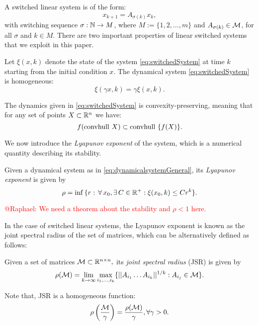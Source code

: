A switched linear system is of the form:
\begin{equation}\label{eq:switchedSystem}x_{k+1} = A_{\sigma(k)}x_k,\end{equation}
with switching sequence $\sigma: \mathbb{N} \to M$, where  $M := \{1,2, \dots,m\}$ and $A_{\sigma(k)} \in \mathcal{M}$, for all $\sigma$ and $k \in M$. There are two important properties of linear switched systems that we exploit in this paper.
\begin{property}\label{property:homogeneity}
Let $\xi(x, k)$ denote the state of the system \eqref{eq:switchedSystem} at time $k$ starting from the initial condition $x$. The dynamical system \eqref{eq:switchedSystem} is homogeneous:
$$\xi(\gamma x, k)= \gamma \xi(x, k). $$
\end{property}
\begin{property}\label{property:convpres}
The dynamics given in \eqref{eq:switchedSystem} is convexity-preserving, meaning that for any set of points $X \subset \mathbb{R}^n$ we have:
$$ f(\mbox{convhull }{X})\subset \mbox{convhull }\{f(X)\}. $$
\end{property}

We now introduce the \emph{Lyapunov exponent} of the system, which is a numerical quantity describing its stability.
\begin{definition}Given a dynamical system as in \eqref{eq:dynamicalsystemGeneral}, its \emph{Lyapunov exponent} is given by
$$\rho =\inf{\{r:\,\forall\, x_0, \exists\, C\in \mathbb{R}^+: \xi(x_0, k)\leq Cr^k\}}. $$
\end{definition}
\textcolor{red}{@Raphael: We need  a theorem about the stability and $\rho<1$ here.}

In the case of switched linear systems, the Lyapunov exponent is known as the joint spectral radius of the set of matrices, which can be alternatively defined as follows:
\begin{definition} \cite{jungers_lncis} Given a set of matrices $\mathcal{M} \subset \mathbb{R}^{n\times n},$ its \emph{joint spectral radius} (JSR) is given by
$$\rho(\mathcal{M}) =\lim_{k\rightarrow \infty} \max_{i_1,\dots, i_k}\{||A_{i_1} \dots A_{i_k}||^{1/k}: A_{i_j}\in\mathcal{M}\}. $$
\end{definition}

\begin{remark}\label{rem:scaling}
Note that, JSR is a homogeneous function:
$$\rho\left(\frac{\mathcal{M}}{\gamma}\right)=\frac{\rho(\mathcal{M})}{\gamma}, \forall \gamma > 0.$$
\end{remark}

